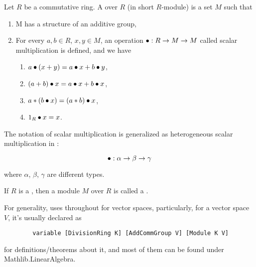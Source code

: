 \begin{definition}[Module]
    \label{Module}
    \leanok

    Let $R$ be a commutative ring. A  over $R$ (in short $R$-module) is a set $M$ such that

    \begin{enumerate}
      \item M has a structure of an additive group,
    
      \item For every $a, b \in R$, $x, y \in M$, an operation $\bullet : R \to M \to M$ called scalar multiplication is defined, and we have
      
        \begin{enumerate}[i]
            \item $a \bullet (x + y) = a \bullet x + b \bullet y$,
            \item $(a + b) \bullet x = a \bullet x + b \bullet x$,
            \item $a * (b \bullet x)=(a * b) \bullet x$,
            \item $1_R \bullet x = x$.
        \end{enumerate}
    \end{enumerate}

\end{definition}

\begin{remark}
    \label{mk:Module}

    The notation of scalar multiplication is generalized as heterogeneous scalar multiplication in \Mathlib:

    $$
    \bullet : \alpha \to \beta \to \gamma
    $$

    where $\alpha$, $\beta$, $\gamma$ are different types.
    
\end{remark}

\begin{definition}
    \label{VectorSpace}
    \leanok

    If $R$ is a , then a module $M$ over $R$ is called a .

\end{definition}

\begin{remark}
    \label{mk:VectorSpace}

    For generality, \Mathlib uses  throughout for vector spaces,
    particularly, for a vector space $V$, it's usually declared as

    \begin{lstlisting}
        variable [DivisionRing K] [AddCommGroup V] [Module K V]
    \end{lstlisting}

    for definitions/theorems about it, and most of them can be found under \textsf{Mathlib.LinearAlgebra}. %
    
\end{remark}

